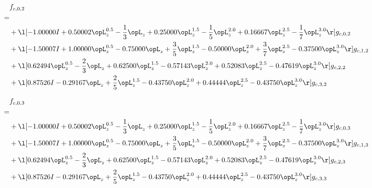 \begin{alignat}{2} 
\label{eq:f_02_0} 
& f_{c,0,2} \nonumber \\ 
 = \\ 
& + \l[  -1.00000 I +  0.50002 \opL_z^{0.5} - \frac{1}{3} \opL_z +  0.25000 \opL_z^{1.5} - \frac{1}{5} \opL_z^{2.0} +  0.16667 \opL_z^{2.5} - \frac{1}{7} \opL_z^{3.0}  \r] g_{c,0,2} \nonumber \\ 
& + \l[  -1.50007 I +  1.00000 \opL_z^{0.5}   -0.75000 \opL_z + \frac{3}{5} \opL_z^{1.5}   -0.50000 \opL_z^{2.0} + \frac{3}{7} \opL_z^{2.5}   -0.37500 \opL_z^{3.0}  \r] g_{c,1,2} \nonumber \\ 
& + \l[  0.62494 \opL_z^{0.5} - \frac{2}{3} \opL_z +  0.62500 \opL_z^{1.5}   -0.57143 \opL_z^{2.0} +  0.52083 \opL_z^{2.5}   -0.47619 \opL_z^{3.0}  \r] g_{c,2,2} \nonumber \\ 
& + \l[  0.87526 I   -0.29167 \opL_z + \frac{2}{5} \opL_z^{1.5}   -0.43750 \opL_z^{2.0} +  0.44444 \opL_z^{2.5}   -0.43750 \opL_z^{3.0}  \r] g_{c,3,2} \nonumber \\ 
\end{alignat} 


\begin{alignat}{2} 
\label{eq:f_03_0} 
& f_{c,0,3} \nonumber \\ 
 = \\ 
& + \l[  -1.00000 I +  0.50002 \opL_z^{0.5} - \frac{1}{3} \opL_z +  0.25000 \opL_z^{1.5} - \frac{1}{5} \opL_z^{2.0} +  0.16667 \opL_z^{2.5} - \frac{1}{7} \opL_z^{3.0}  \r] g_{c,0,3} \nonumber \\ 
& + \l[  -1.50007 I +  1.00000 \opL_z^{0.5}   -0.75000 \opL_z + \frac{3}{5} \opL_z^{1.5}   -0.50000 \opL_z^{2.0} + \frac{3}{7} \opL_z^{2.5}   -0.37500 \opL_z^{3.0}  \r] g_{c,1,3} \nonumber \\ 
& + \l[  0.62494 \opL_z^{0.5} - \frac{2}{3} \opL_z +  0.62500 \opL_z^{1.5}   -0.57143 \opL_z^{2.0} +  0.52083 \opL_z^{2.5}   -0.47619 \opL_z^{3.0}  \r] g_{c,2,3} \nonumber \\ 
& + \l[  0.87526 I   -0.29167 \opL_z + \frac{2}{5} \opL_z^{1.5}   -0.43750 \opL_z^{2.0} +  0.44444 \opL_z^{2.5}   -0.43750 \opL_z^{3.0}  \r] g_{c,3,3} \nonumber \\ 
\end{alignat} 


